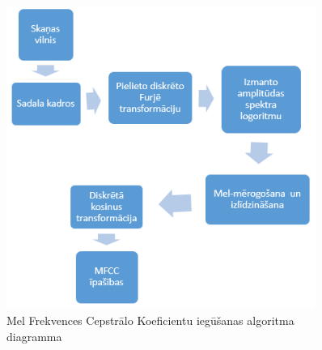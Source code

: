 \documentclass[12pt,paper=A4]{report}
\begin{document}
\begin{figure}[h] \centering
\includegraphics[width=0.90\textwidth]{mfcc} 
\caption{Mel Frekvences Cepstrālo Koeficientu iegūšanas algoritma diagramma \cite{dtw12}}  \label{mfcc} 
\end{figure}
\end{document}
